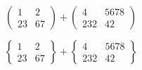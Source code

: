 \documentclass[preview, border=1pt, varwidth]{standalone}
\begin{document}
\[
\begin{pmatrix}
1 & 2 \\ 
23 & 67 
\end{pmatrix} +
\begin{pmatrix}
4 & 5678 \\ 
232 & 42 
\end{pmatrix}
\]

\[
\begin{Bmatrix}
1 & 2 \\ 
23 & 67 
\end{Bmatrix} +
\begin{Bmatrix}
4 & 5678 \\ 
232 & 42 
\end{Bmatrix}
\]
\end{document}
